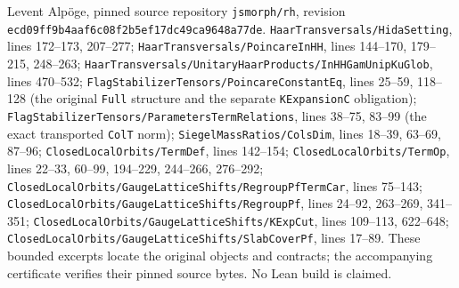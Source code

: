 Levent Alp\"oge, pinned source repository \texttt{jsmorph/rh},
revision \texttt{ecd09ff9b4aaf6c08f2b5ef17dc49ca9648a77de}.
\texttt{HaarTransversals/HidaSetting}, lines 172--173, 207--277;
\texttt{HaarTransversals/PoincareInHH}, lines 144--170,
179--215, 248--263;
\texttt{HaarTransversals/UnitaryHaarProducts/InHHGamUnipKuGlob},
lines 470--532;
\texttt{FlagStabilizerTensors/PoincareConstantEq}, lines 25--59,
118--128 (the original \texttt{Full} structure and the separate
\texttt{KExpansionC} obligation);
\texttt{FlagStabilizerTensors/ParametersTermRelations},
lines 38--75, 83--99 (the exact transported \texttt{ColT} norm);
\texttt{SiegelMassRatios/ColsDim}, lines 18--39, 63--69, 87--96;
\texttt{ClosedLocalOrbits/TermDef}, lines 142--154;
\texttt{ClosedLocalOrbits/TermOp}, lines 22--33, 60--99,
194--229, 244--266, 276--292;
\texttt{ClosedLocalOrbits/GaugeLatticeShifts/RegroupPfTermCar},
lines 75--143;
\texttt{ClosedLocalOrbits/GaugeLatticeShifts/RegroupPf},
lines 24--92, 263--269, 341--351;
\texttt{ClosedLocalOrbits/GaugeLatticeShifts/KExpCut},
lines 109--113, 622--648;
\texttt{ClosedLocalOrbits/GaugeLatticeShifts/SlabCoverPf},
lines 17--89.
These bounded excerpts locate the original objects and contracts;
the accompanying certificate verifies their pinned source bytes.
No Lean build is claimed.
